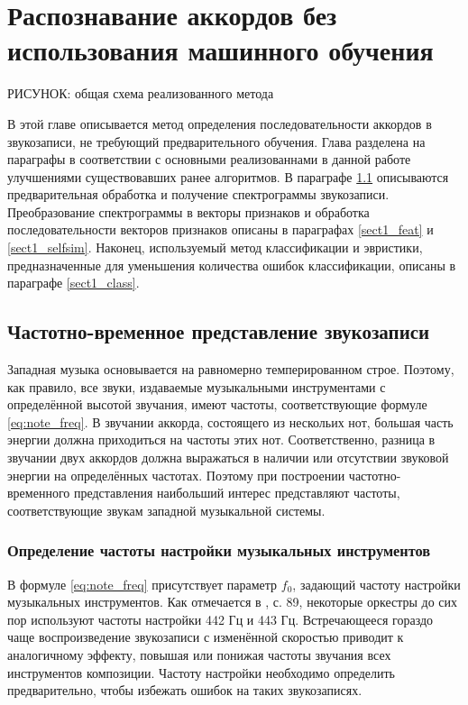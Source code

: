 \chapter{Распознавание аккордов без использования машинного обучения}
\label{chapt1}

РИСУНОК: общая схема реализованного метода

В этой главе описывается метод определения последовательности аккордов в
звукозаписи, не требующий предварительного обучения. Глава разделена на
параграфы в соответствии с основными реализованнами в данной работе улучшениями
существовавших ранее алгоритмов. В параграфе \ref{sect1_spectrogram} описываются
предварительная обработка и получение спектрограммы звукозаписи. Преобразование
спектрограммы в векторы признаков и обработка последовательности векторов
признаков описаны в параграфах \ref{sect1_feat} и \ref{sect1_selfsim}. Наконец,
используемый метод классификации и эвристики, предназначенные для уменьшения
количества ошибок классификации, описаны в параграфе \ref{sect1_class}.

\section{Частотно-временное представление звукозаписи} \label{sect1_spectrogram}

Западная музыка основывается на равномерно темперированном строе. Поэтому, как
правило, все звуки, издаваемые музыкальными инструментами с определённой высотой
звучания, имеют частоты, соответствующие формуле \ref{eq:note_freq}. В звучании
аккорда, состоящего из нескольих нот, большая часть энергии должна приходиться
на частоты этих нот. Соответственно, разница в звучании двух аккордов должна
выражаться в наличии или отсутствии звуковой энергии на определённых частотах.
Поэтому при построении частотно-временного представления наибольший интерес
представляют частоты, соответствующие звукам западной музыкальной системы. 

\subsection{Определение частоты настройки музыкальных инструментов}
\label{ssect1_f0}

В формуле \ref{eq:note_freq} присутствует параметр $f_0$, задающий частоту
настройки музыкальных инструментов. Как отмечается в \cite{Lerch2012}, с. 89,
некоторые оркестры до сих пор используют частоты настройки 442 Гц и 443 Гц.
Встречающееся гораздо чаще воспроизведение звукозаписи с изменённой скоростью
приводит к аналогичному эффекту, повышая или понижая частоты звучания всех
инструментов композиции. Частоту настройки необходимо определить предварительно,
чтобы избежать ошибок на таких звукозаписях.

